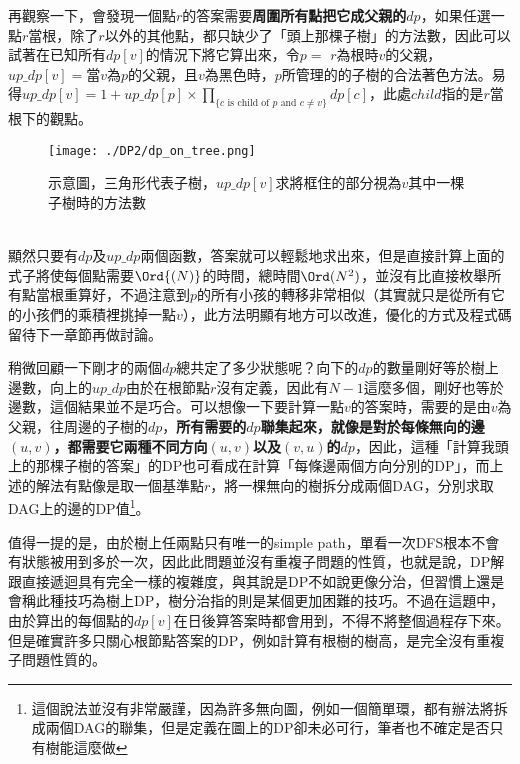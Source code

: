 再觀察一下，會發現一個點$r$的答案需要\textbf{周圍所有點把它成父親的$dp$}，如果任選一點$r$當根，除了$r$以外的其他點，都只缺少了「頭上那棵子樹」的方法數，因此可以試著在已知所有$dp[v]$的情況下將它算出來，令$p=$ $r$為根時$v$的父親，$up\_dp[v] =$當$v$為$p$的父親，且$v$為黑色時，$p$所管理的的子樹的合法著色方法。易得$up\_dp[v] = 1 + up\_dp[p] \times \prod_{\{c\mbox{ is child of }p \mbox{ and } c \neq v \}}{dp[c]}$，此處$child$指的是$r$當根下的觀點。
\begin{figure}[ht]
	\begin{center}
		\centerline{\texttt{[image: ./DP2/dp\_on\_tree.png]}}
		\caption{示意圖，三角形代表子樹，$up\_dp[v]$求將框住的部分視為$v$其中一棵子樹時的方法數}
	\end{center}
\end{figure}
\\
顯然只要有$dp$及$up\_dp$兩個函數，答案就可以輕鬆地求出來，但是直接計算上面的式子將使每個點需要$\Ord{(N)}$的時間，總時間$\Ord(N^2)$，並沒有比直接枚舉所有點當根重算好，不過注意到$p$的所有小孩的轉移非常相似（其實就只是從所有它的小孩們的乘積裡挑掉一點$v$），此方法明顯有地方可以改進，優化的方式及程式碼留待下一章節再做討論。

稍微回顧一下剛才的兩個$dp$總共定了多少狀態呢？向下的$dp$的數量剛好等於樹上邊數，向上的$up\_dp$由於在根節點$r$沒有定義，因此有$N-1$這麼多個，剛好也等於邊數，這個結果並不是巧合。可以想像一下要計算一點$v$的答案時，需要的是由$v$為父親，往周邊的子樹的$dp$，\textbf{所有需要的$dp$聯集起來，就像是對於每條無向的邊$(u, v)$，都需要它兩種不同方向$(u, v)$以及$(v, u)$的$dp$}，因此，這種「計算我頭上的那棵子樹的答案」的DP也可看成在計算「每條邊兩個方向分別的DP」，而上述的解法有點像是取一個基準點$r$，將一棵無向的樹拆分成兩個DAG，分別求取DAG上的邊的DP值\footnote{這個說法並沒有非常嚴謹，因為許多無向圖，例如一個簡單環，都有辦法將拆成兩個DAG的聯集，但是定義在圖上的DP卻未必可行，筆者也不確定是否只有樹能這麼做}。

值得一提的是，由於樹上任兩點只有唯一的simple path，單看一次DFS根本不會有狀態被用到多於一次，因此此問題並沒有重複子問題的性質，也就是說，DP解跟直接遞迴具有完全一樣的複雜度，與其說是DP不如說更像分治，但習慣上還是會稱此種技巧為樹上DP，樹分治指的則是某個更加困難的技巧。不過在這題中，由於算出的每個點的$dp[v]$在日後算答案時都會用到，不得不將整個過程存下來。但是確實許多只關心根節點答案的DP，例如計算有根樹的樹高，是完全沒有重複子問題性質的。

